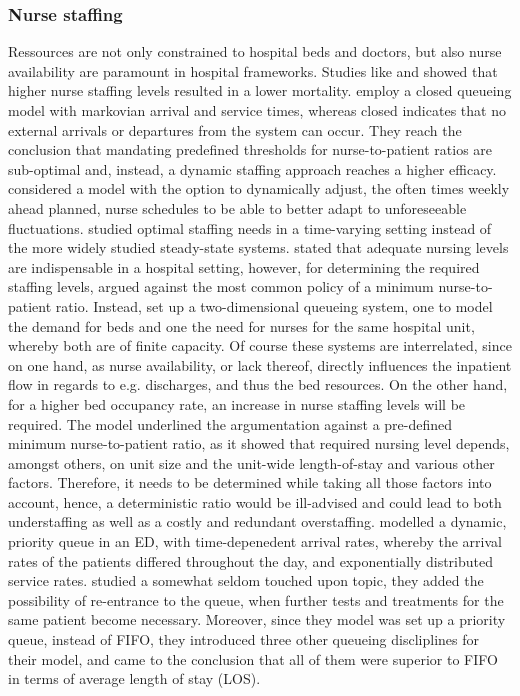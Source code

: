 \documentclass[11pt,a4paper]{article}
\begin{document}
\begin{spacing}{1.8}
\subsubsection{Nurse staffing}
Ressources are not only constrained to hospital beds and doctors, but also nurse availability are paramount in hospital frameworks. Studies like \citep{Needleman2002} and \citep{Aiken2002} showed that higher nurse staffing levels resulted in a lower mortality.
\citep{Vericourt2011} employ a closed queueing model with markovian arrival and service times, whereas closed indicates that no external arrivals or departures from the system can occur. They reach the conclusion that mandating predefined thresholds for nurse-to-patient ratios are sub-optimal and, instead, a dynamic staffing approach reaches a higher efficacy. 
\citep{Bard2005} considered a model with the option to dynamically adjust, the often times weekly ahead planned, nurse schedules to be able to better adapt to unforeseeable fluctuations.
\citet{Green2007} studied optimal staffing needs in a time-varying setting instead of the more widely studied steady-state systems. \citet{Yankovic2011} stated that adequate nursing levels are indispensable in a hospital setting, however, for determining the required staffing levels, \citet{Yankovic2011} argued against the most common policy of a minimum nurse-to-patient ratio. Instead,  \citet{Yankovic2011} set up a two-dimensional queueing system, one to model the demand for beds and one the need for nurses for the same hospital unit, whereby both are of finite capacity. Of course these systems are interrelated, since on one hand,  as nurse availability, or lack thereof, directly influences the inpatient flow in regards to e.g. discharges, and thus the bed resources. On the other hand, for a higher  bed occupancy rate,  an increase in nurse staffing levels will be required. 
The model underlined the argumentation against a pre-defined minimum nurse-to-patient ratio, as it showed that required nursing level depends, amongst others, on unit size and the unit-wide length-of-stay and various other factors. Therefore, it needs to be determined while taking all those factors into account, hence, a deterministic ratio would be ill-advised and could lead to both understaffing as well as a costly and redundant overstaffing. 
\citet{Tan2012} modelled a dynamic, priority queue in an ED, with time-depenedent arrival rates, whereby the arrival rates of the patients differed throughout the day, and exponentially distributed service rates. \citet{Tan2012} studied a somewhat seldom touched upon topic, they added the possibility of re-entrance to the queue, when further tests and treatments for the same patient become necessary.  Moreover, since they model was set up a priority queue, instead of  FIFO,
they introduced three other queueing discliplines for their model, and came to the conclusion that all of them were superior to FIFO in terms of average length of stay (LOS). 





\end{spacing}
\end{document}

